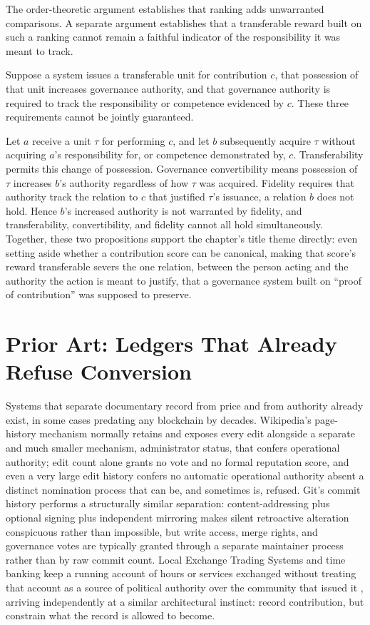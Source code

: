 The order-theoretic argument establishes that ranking adds unwarranted comparisons. A separate argument establishes that a transferable reward built on such a ranking cannot remain a faithful indicator of the responsibility it was meant to track.

\begin{proposition}
Suppose a system issues a transferable unit for contribution $c$, that possession of that unit increases governance authority, and that governance authority is required to track the responsibility or competence evidenced by $c$. These three requirements cannot be jointly guaranteed.
\end{proposition}

Let $a$ receive a unit $\tau$ for performing $c$, and let $b$ subsequently acquire $\tau$ without acquiring $a$'s responsibility for, or competence demonstrated by, $c$. Transferability permits this change of possession. Governance convertibility means possession of $\tau$ increases $b$'s authority regardless of how $\tau$ was acquired. Fidelity requires that authority track the relation to $c$ that justified $\tau$'s issuance, a relation $b$ does not hold. Hence $b$'s increased authority is not warranted by fidelity, and transferability, convertibility, and fidelity cannot all hold simultaneously. Together, these two propositions support the chapter's title theme directly: even setting aside whether a contribution score can be canonical, making that score's reward transferable severs the one relation, between the person acting and the authority the action is meant to justify, that a governance system built on ``proof of contribution'' was supposed to preserve.

\section{Prior Art: Ledgers That Already Refuse Conversion}

Systems that separate documentary record from price and from authority already exist, in some cases predating any blockchain by decades. Wikipedia's page-history mechanism normally retains and exposes every edit alongside a separate and much smaller mechanism, administrator status, that confers operational authority; edit count alone grants no vote and no formal reputation score, and even a very large edit history confers no automatic operational authority absent a distinct nomination process that can be, and sometimes is, refused. Git's commit history performs a structurally similar separation: content-addressing plus optional signing plus independent mirroring makes silent retroactive alteration conspicuous rather than impossible, but write access, merge rights, and governance votes are typically granted through a separate maintainer process rather than by raw commit count. Local Exchange Trading Systems and time banking keep a running account of hours or services exchanged without treating that account as a source of political authority over the community that issued it \cite{cahn2000}, arriving independently at a similar architectural instinct: record contribution, but constrain what the record is allowed to become.

